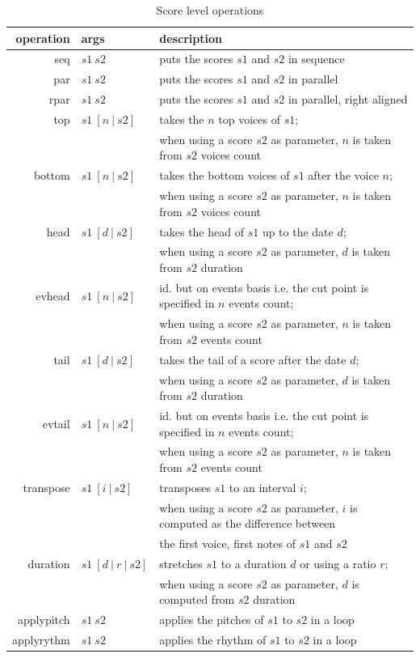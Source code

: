 \documentclass[twoside,10pt,a4paper]{article}
\begin{document}
\begin{table}[htdp]
\begin{center}
\begin{tabular}{rll}
\hline
operation & args		&	description \\
\hline
seq 	&	$s1\ s2$		& puts the scores $s1$ and $s2$ in sequence \\
par 	&	$s1\ s2$		& puts the scores $s1$ and $s2$ in parallel \\ 
rpar	&	$s1\ s2$		& puts the scores $s1$ and $s2$ in parallel, right aligned \\
top 	&	$s1\ [n\ | \ s2]$ 	& takes the $n$ top voices of $s1$; \\
		&	& when using a score $s2$ as parameter, $n$ is taken from $s2$ voices count \\
bottom 	&	$s1\ [n\ | \ s2]$ 	& takes the bottom voices of $s1$ after the voice $n$;  \\
		&	& when using a score $s2$ as parameter, $n$ is taken from $s2$ voices count \\
head	& 	$s1\ [d\ | \ s2]$	& takes the head of $s1$ up to the date $d$; \\
		& 	& when using a score $s2$ as parameter, $d$ is taken from $s2$ duration \\
evhead 	&	$s1\ [n\ | \ s2]$	& id. but on events basis i.e. the cut point is specified in $n$ events count; \\
		& 	& when using a score $s2$ as parameter, $n$ is taken from $s2$ events count \\
tail	&	$s1\ [d\ | \ s2]$ 	& takes the tail of a score after the date $d$; \\
		& 	& when using a score $s2$ as parameter, $d$ is taken from $s2$ duration \\
evtail 	&	$s1\ [n\ | \ s2]$ 	& id. but on events basis i.e. the cut point is specified in $n$ events count; \\
		& 	& when using a score $s2$ as parameter, $n$ is taken from $s2$ events count \\
transpose 	&	$s1\ [i\ | \ s2]$	& transposes $s1$ to an interval $i$; \\
			& 	& when using a score $s2$ as parameter, $i$ is computed as the difference between \\
			& 	& the first voice, first notes of $s1$ and $s2$ \\
duration 	&	$s1\ [d\ |\ r\ |\ s2]$	& stretches $s1$ to a duration $d$ or using a ratio $r$; \\
			& 	& when using a score $s2$ as parameter, $d$ is computed from $s2$ duration \\
applypitch 	&	$s1\ s2$	& applies the pitches of $s1$ to $s2$ in a loop \\
applyrythm 	&	$s1\ s2$	& applies the rhythm of $s1$ to $s2$ in a loop \\
\hline
\end{tabular}
\end{center}
\caption{Score level operations}
\label{operations}
\end{table}
\end{document}
